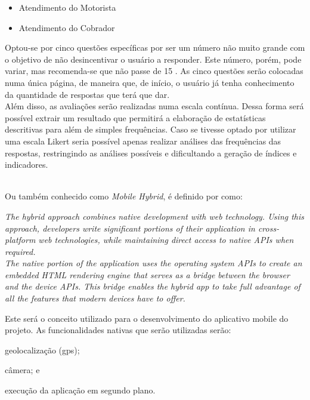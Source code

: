 \begin{description}
\begin{itemize}
	    \item Atendimento do Motorista
	    \item Atendimento do Cobrador
	    \end{itemize}
	    Optou-se por cinco questões específicas por ser um número não muito grande com o objetivo de não desincentivar o usuário a responder. Este número, porém, pode variar, mas recomenda-se que não passe de 15 \cite{teller2013}. As cinco questões serão colocadas numa única página, de maneira que, de início, o usuário já tenha conhecimento da quantidade de respostas que terá que dar.\\
	    Além disso, as avaliações serão realizadas numa escala contínua. Dessa forma será possível extrair um resultado que permitirá a elaboração de estatísticas descritivas para além de simples frequências. Caso se tivesse optado por utilizar uma escala Likert seria possível apenas realizar análises das frequências das respostas, restringindo as análises possíveis e dificultando a geração de índices e indicadores.\cite{favero2009}%
%
    \item[Desenvolvimento Móvel Híbrido] \hfill \\
        Ou também conhecido como \textit{Mobile Hybrid}, é definido por  como:
        \begin{citacao}
            \textit{The hybrid approach combines native development with web technology. Using this approach, developers write significant portions of their application in cross-platform web technologies, while maintaining direct access to native APIs when required.}\\
        \textit{The native portion of the application uses the operating system APIs to create an embedded HTML rendering engine that serves as a bridge between the browser and the device APIs. This bridge enables the hybrid app to take full advantage of all the features that modern devices have to offer.}
        \end{citacao}
        Este será o conceito utilizado para o desenvolvimento do aplicativo mobile do projeto. As funcionalidades nativas que serão utilizadas serão:%
            \begin{enumerate*}[label=\itshape\alph*\upshape)]
                \item geolocalização (gps);
                \item câmera; e
                \item execução da aplicação em segundo plano.
            \end{enumerate*}%

\end{description}
